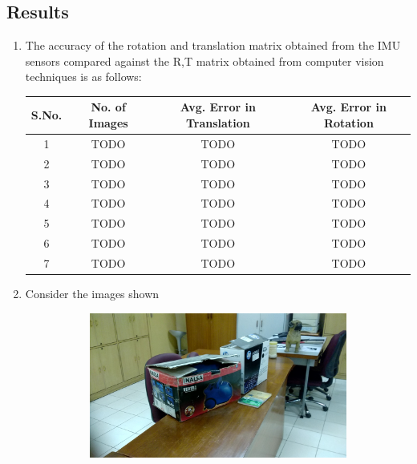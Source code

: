 \documentclass{article}
\begin{document}
		\subsection{Results}
			\begin{enumerate}
				\item The accuracy of the rotation and translation matrix obtained from the IMU sensors compared against the R,T matrix obtained from computer vision techniques is as follows:
	\\ 					\begin{tabular}{|c | c | c | c |}
 						\hline
 						S.No. & No. of Images & Avg. Error in Translation & Avg. Error in Rotation \\ \hline
 						1 & TODO & TODO & TODO \\ \hline
 						2 & TODO & TODO & TODO \\ \hline
 						3 & TODO & TODO & TODO \\ \hline
 						4 & TODO & TODO & TODO \\ \hline
 						5 & TODO & TODO & TODO \\ \hline
 						6 & TODO & TODO & TODO \\ \hline
 						7 & TODO & TODO & TODO \\ \hline
					\end{tabular}
				\item Consider the images shown
				\begin{figure}[H]
					\centering
					\begin{subfigure}{.33\textwidth}
					  	\centering
					  	\includegraphics[width=1.0\linewidth]{1_0_image.jpg}
					  	\caption{}
					  	\label{fig:sub1}
					\end{subfigure}%
					\begin{subfigure}{.33\textwidth}

\end{subfigure}
\end{figure}
\end{enumerate}
\end{document}
